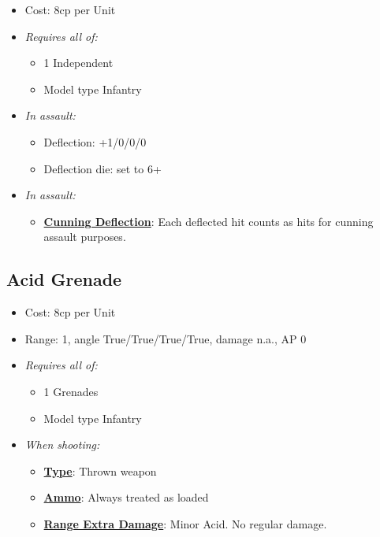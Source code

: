 \documentclass[a4paper,12pt]{article}
\begin{document}
\begin{itemize}
\item Cost: 8cp per Unit
\item \textit{Requires all of:}
\begin{itemize}
\item 1 Independent
\item Model type Infantry
\end{itemize}

\item \textit{In assault:}
\begin{itemize}
\item Deflection: +1/0/0/0
\item Deflection die: set to 6+
\end{itemize}

\item \textit{In assault:}
\begin{itemize}
\item \textbf{\hyperref[rule-special-cunning-deflection]{Cunning Deflection}}: Each deflected hit counts as hits for cunning assault purposes.

\end{itemize}




\end{itemize}

\subsection{Acid Grenade}
\label{equipment-acid-grenade}

\begin{itemize}
\item Cost: 8cp per Unit
\item Range: 1, angle True/True/True/True, damage n.a., AP 0
\item \textit{Requires all of:}
\begin{itemize}
\item 1 Grenades
\item Model type Infantry
\end{itemize}
\item \textit{When shooting:}
\begin{itemize}
\item \textbf{\hyperref[rule-special-type]{Type}}: Thrown weapon
\item \textbf{\hyperref[rule-special-ammo]{Ammo}}: Always treated as loaded
\item \textbf{\hyperref[rule-special-range-extra-damage]{Range Extra Damage}}: Minor Acid. No regular damage.

\end{itemize}






\end{itemize}
\end{document}
